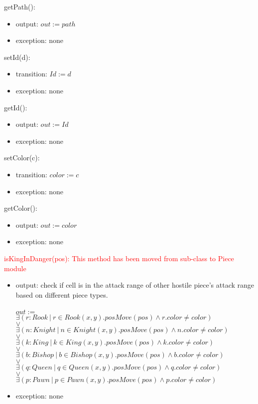 \documentclass[12pt]{article}
\begin{document}
\noindent getPath():
\begin{itemize}
\item output: $out := path$
\item exception: none
\end{itemize}

\noindent setId(d):
\begin{itemize}
\item transition: $Id := d$ 
\item exception: none
\end{itemize}

\noindent getId():
\begin{itemize}
\item output: $out := Id$
\item exception: none
\end{itemize}

\noindent setColor(c):
\begin{itemize}
\item transition: $color := c$ 
\item exception: none
\end{itemize}

\noindent getColor():
\begin{itemize}
\item output: $out := color$
\item exception: none\\
\end{itemize}

\newpage

\noindent \textcolor{red}{isKingInDanger(pos): This method has been moved from sub-class to Piece module}
\begin{itemize}
\item output: check if cell is in the attack range of other hostile piece's attack range based on different piece types.\\
\\
$out :=$\\
$\exists(r : Rook \ | \ r \in Rook(x,y).posMove(pos) \wedge r.color \ne color) $ \\
$\vee$\\
$\exists(n : Knight\ | \ n \in Knight(x,y).posMove(pos)\wedge n.color \ne color) $ \\
$\vee$\\
$\exists(k : King \ | \ k \in King(x,y).posMove(pos)\wedge k.color \ne color) $ \\
$\vee$\\
$\exists(b : Bishop\ | \ b \in Bishop(x,y).posMove(pos)\wedge b.color \ne color) $ \\
$\vee$\\
$\exists(q : Queen \ | \ q \in Queen(x,y).posMove(pos)\wedge q.color \ne color) $ \\
$\vee$\\
$\exists(p : Pawn\ | \ p \in Pawn(x,y).posMove(pos)\wedge p.color \ne color) $ \\
\item exception: none
\end{itemize}
\end{document}

